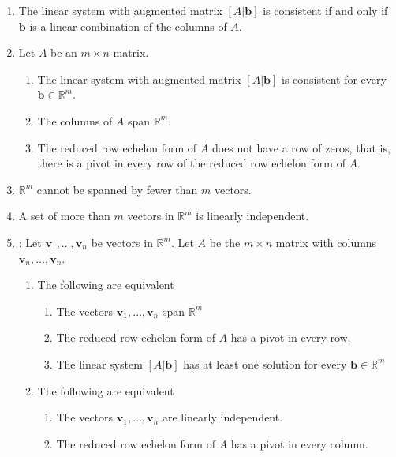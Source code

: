 \documentclass{article}
\begin{document}
\begin{multicols}{2}
\begin{itemize}[leftmargin=0.5cm]
\begin{enumerate}
            \item[5.1] The linear system with augmented matrix $[A|\textbf{b}]$ is consistent if and only if $\textbf{b}$ is a linear combination of the columns of $A$.
            \item[5.2] Let $A$ be an $m\times n$ matrix.
                \begin{enumerate}
                    \item The linear system with augmented matrix $[A|\textbf{b}]$ is consistent for every $\textbf{b}\in\mathbb{R}^m$.
                    \item The columns of $A$ span $\mathbb{R}^m$.
                    \item The reduced row echelon form of $A$ does not have a row of zeros, that is, there is a pivot in every row of the reduced row echelon form of $A$.
                \end{enumerate}
            \item[5.3] $\mathbb{R}^m$ cannot be spanned by fewer than $m$ vectors.
            \item[7.2] A set of more than $m$ vectors in $\mathbb{R}^m$ is linearly independent.
            \item [7.3]: Let $\textbf{v}_1,\ldots,\textbf{v}_n$ be vectors in $\mathbb{R}^m$. Let $A$ be the $m\times n$ matrix with columns $\textbf{v}_n,\ldots,\textbf{v}_n$.
                \begin{enumerate}
                    \item The following are equivalent
                        \begin{enumerate}
                            \item The vectors $\textbf{v}_1,\ldots,\textbf{v}_n$ span $\mathbb{R}^m$
                            \item The reduced row echelon form of $A$ has a pivot in every row.
                            \item The linear system $[A|\textbf{b}]$ has at least one solution for every $\textbf{b}\in\mathbb{R}^m$
                        \end{enumerate}
                    \item The following are equivalent
                        \begin{enumerate}
                            \item The vectors $\textbf{v}_1,\ldots,\textbf{v}_n$ are linearly independent.
                            \item The reduced row echelon form of $A$ has a pivot in every column.

\end{enumerate}
\end{enumerate}
\end{enumerate}
\end{itemize}
\end{multicols}
\end{document}
